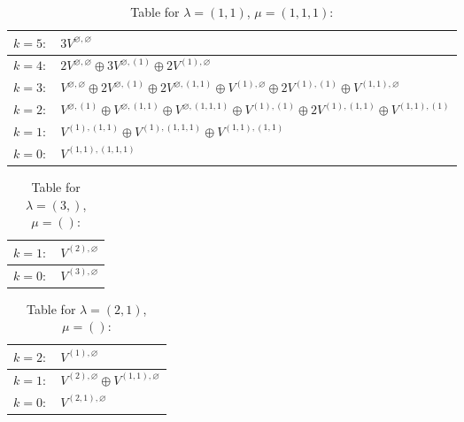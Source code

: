\renewcommand{\arraystretch}{1.6} 
\begin{table}[H]
\centering
\caption{Table for $\lambda = (1, 1)$, $\mu = (1, 1, 1)$:}
\begin{tabular}{|>{\centering\arraybackslash}p{15cm}|}
\hline
 $k = 5: \quad 3 V^{\varnothing, \varnothing} $ \\ \hline
 $k = 4: \quad 2 V^{\varnothing, \varnothing} \oplus 3 V^{\varnothing, (1)} \oplus 2 V^{(1), \varnothing} $ \\ \hline
 $k = 3: \quad V^{\varnothing, \varnothing} \oplus 2 V^{\varnothing, (1)} \oplus 2 V^{\varnothing, (1, 1)} \oplus V^{(1), \varnothing} \oplus 2 V^{(1), (1)} \oplus V^{(1, 1), \varnothing} $ \\ \hline
 $k = 2: \quad V^{\varnothing, (1)} \oplus V^{\varnothing, (1, 1)} \oplus V^{\varnothing, (1, 1, 1)} \oplus V^{(1), (1)} \oplus 2 V^{(1), (1, 1)} \oplus V^{(1, 1), (1)} $ \\ \hline
 $k = 1: \quad V^{(1), (1, 1)} \oplus V^{(1), (1, 1, 1)} \oplus V^{(1, 1), (1, 1)} $ \\ \hline
 $k = 0: \quad V^{(1, 1), (1, 1, 1)} $ \\ \hline
\end{tabular}
\end{table}

\renewcommand{\arraystretch}{1.6} 
\begin{table}[H]
\centering
\caption{Table for $\lambda = (3,)$, $\mu = ()$:}
\begin{tabular}{|>{\centering\arraybackslash}p{15cm}|}
\hline
 $k = 1: \quad V^{(2), \varnothing} $ \\ \hline
 $k = 0: \quad V^{(3), \varnothing} $ \\ \hline
\end{tabular}
\end{table}

\renewcommand{\arraystretch}{1.6} 
\begin{table}[H]
\centering
\caption{Table for $\lambda = (2, 1)$, $\mu = ()$:}
\begin{tabular}{|>{\centering\arraybackslash}p{15cm}|}
\hline
 $k = 2: \quad V^{(1), \varnothing} $ \\ \hline
 $k = 1: \quad V^{(2), \varnothing} \oplus V^{(1, 1), \varnothing} $ \\ \hline
 $k = 0: \quad V^{(2, 1), \varnothing} $ \\ \hline
\end{tabular}
\end{table}

